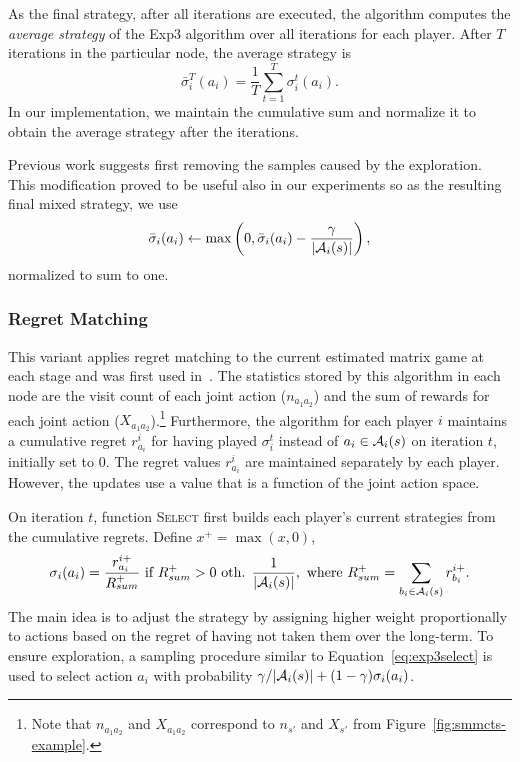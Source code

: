 As the final strategy, after all iterations are executed, the algorithm computes the \emph{average strategy} of the Exp3 algorithm over all iterations for each player.
 After $T$ iterations in the particular node, the average strategy is
\begin{equation}
\bar{\sigma}^T_i(a_i) = \frac{1}{T}\sum_{t=1}^T \sigma^t_i(a_i).
\end{equation}
In our implementation, we maintain the cumulative sum and normalize it to obtain the average strategy after the iterations.

Previous work \cite{Teytaud11Upper} suggests first removing the samples caused by the exploration.
This modification proved to be useful also in our experiments
so as the resulting final mixed strategy, we use
\begin{equation}
\bar{\sigma}_i(a_i) \leftarrow \max\left(0, \bar{\sigma}_i(a_i) - \frac{\gamma}{|\mathcal{A}_i(s)|}\right),
\end{equation}
normalized to sum to one.

\subsubsection{Regret Matching} \label{sec:rm}

This variant applies regret matching \cite{Hart00} to the current estimated matrix game at each stage and was first used in~\cite{Lanctot13Goofspiel}. The statistics stored by this algorithm in each node are the visit count of each joint action ($n_{a_1a_2}$) and the sum of rewards for each joint action ($X_{a_1a_2}$).\footnote{Note that $n_{a_1a_2}$ and $X_{a_1a_2}$ correspond to $n_{s'}$ and $X_{s'}$ from Figure~\ref{fig:smmcts-example}.}
Furthermore, the algorithm for each player $i$ maintains a cumulative regret $r^i_{a_i}$ for having played $\sigma_i^t$ instead of $a_i \in \mathcal{A}_i(s)$ on iteration $t$, initially set to 0. The regret values $r^i_{a_i}$ are maintained separately by each player. However, the updates use a value that is a function of the joint action space.

On iteration $t$, function \textsc{Select} first builds
each player's current strategies from the cumulative regrets. Define $x^+ = \max(x,0)$,
\begin{equation}
\label{eq:rm}
\sigma_i(a_i) = \frac{r^{i+}_{a_i}}{R^+_{sum}} \mbox{ if } R^+_{sum} > 0
\mbox{ oth. } \frac{1}{|\mathcal{A}_i(s)|}, \mbox{ where } R^+_{sum} = \sum_{b_i \in \mathcal{A}_i(s)}{r^{i+}_{b_i}}.
\end{equation}
The main idea is to adjust the strategy by assigning higher weight proportionally to actions based on the regret of having not taken them over the long-term.
To ensure exploration, a sampling procedure similar to Equation~\ref{eq:exp3select} is used to select action $a_i$ with probability
$\gamma/|\mathcal{A}_i(s)| + (1-\gamma) \sigma_i(a_i)$.

